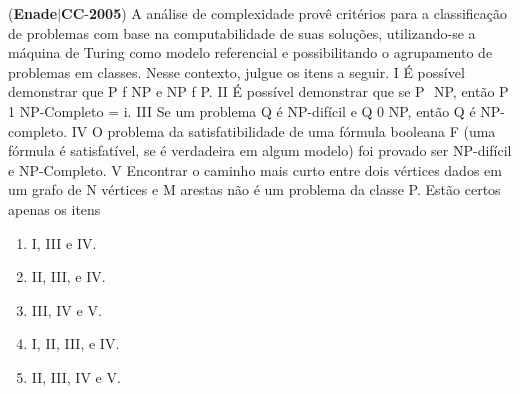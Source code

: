 \documentclass{exam}
\begin{document}
\begin{questions}
\begin{enumerate}[label=\alph*)]
	\end{enumerate}

\question (\textbf{Enade}$|$\textbf{CC}-\textbf{2005}) A análise de complexidade provê critérios para a classificação
de problemas com base na computabilidade de suas soluções,
utilizando-se a máquina de Turing como modelo referencial e
possibilitando o agrupamento de problemas em classes. Nesse
contexto, julgue os itens a seguir.
I É possível demonstrar que P f NP e NP f P.
II É possível demonstrar que se P  NP, então
P 1 NP-Completo = i.
III Se um problema Q é NP-difícil e Q 0 NP, então Q é
NP-completo.
IV O problema da satisfatibilidade de uma fórmula booleana F
(uma fórmula é satisfatível, se é verdadeira em algum
modelo) foi provado ser NP-difícil e NP-Completo.
V Encontrar o caminho mais curto entre dois vértices dados
em um grafo de N vértices e M arestas não é um problema
da classe P.
Estão certos apenas os itens
	\begin{enumerate}[label=\alph*)]
		\item  I, III e IV.
		\item  II, III, e IV.
		\item  III, IV e V.
		\item  I, II, III, e IV.
		\item  II, III, IV e V.

	\end{enumerate}


\end{questions}
\end{document}
